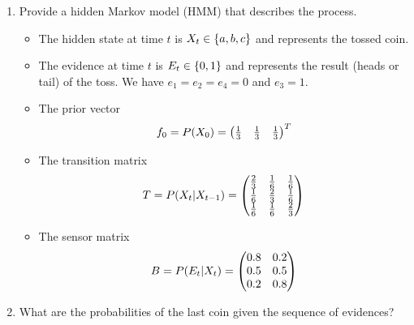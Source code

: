 \documentclass[11pt, a4paper]{article}
\begin{document}
\begin{enumerate}
    \item Provide a hidden Markov model (HMM) that describes the process.

    \begin{solution}
        \begin{itemize}
            \item The hidden state at time $t$ is $X_t \in \{a, b, c\}$ and represents the tossed coin.

            \item The evidence at time $t$ is $E_t \in \{0, 1\}$ and represents the result (heads or tail) of the toss. We have $e_1 = e_2 = e_4 = 0$ and $e_3 = 1$.

            \item The prior vector
                \begin{equation*}
                    f_0 = P(X_0) = \begin{pmatrix}\frac{1}{3} & \frac{1}{3} & \frac{1}{3}\end{pmatrix}^T
                \end{equation*}

            \item The transition matrix
                \begin{equation*}
                    T = P(X_t \vert X_{t-1}) = \begin{pmatrix}
                        \frac{2}{3} & \frac{1}{6} & \frac{1}{6} \\
                        \frac{1}{6} & \frac{2}{3} & \frac{1}{6} \\
                        \frac{1}{6} & \frac{1}{6} & \frac{2}{3}
                    \end{pmatrix}
                \end{equation*}

            \item The sensor matrix
                \begin{equation*}
                    B = P(E_t \vert X_t) = \begin{pmatrix}
                        0.8 & 0.2 \\
                        0.5 & 0.5 \\
                        0.2 & 0.8
                    \end{pmatrix}
                \end{equation*}
        \end{itemize}
    \end{solution}

    \item What are the probabilities of the last coin given the sequence of evidences?


\end{enumerate}
\end{document}
